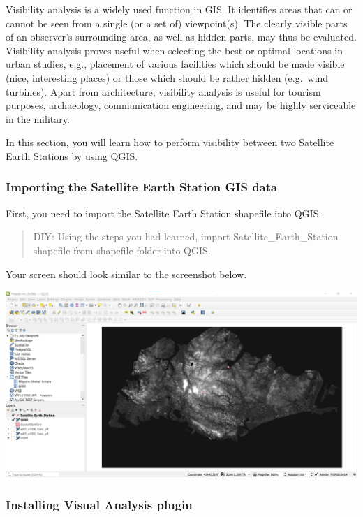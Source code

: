 \documentclass[
  letterpaper,
  DIV=11,
  numbers=noendperiod]{scrreprt}
\begin{document}
Visibility analysis is a widely used function in GIS. It identifies
areas that can or cannot be seen from a single (or a set of)
viewpoint(s). The clearly visible parts of an observer's surrounding
area, as well as hidden parts, may thus be evaluated.\\
Visibility analysis proves useful when selecting the best or optimal
locations in urban studies, e.g., placement of various facilities which
should be made visible (nice, interesting places) or those which should
be rather hidden (e.g.~wind turbines). Apart from architecture,
visibility analysis is useful for tourism purposes, archaeology,
communication engineering, and may be highly serviceable in the
military.

In this section, you will learn how to perform visibility between two
Satellite Earth Stations by using QGIS.

\hypertarget{importing-the-satellite-earth-station-gis-data}{%
\subsubsection{Importing the Satellite Earth Station GIS
data}\label{importing-the-satellite-earth-station-gis-data}}

First, you need to import the Satellite Earth Station shapefile into
QGIS.

\begin{quote}
DIY: Using the steps you had learned, import Satellite\_Earth\_Station
shapefile from shapefile folder into QGIS.
\end{quote}

Your screen should look similar to the screenshot below.

\includegraphics{./img06/image54.jpg}

\hypertarget{installing-visual-analysis-plugin}{%
\subsubsection{Installing Visual Analysis
plugin}\label{installing-visual-analysis-plugin}}
\end{document}
